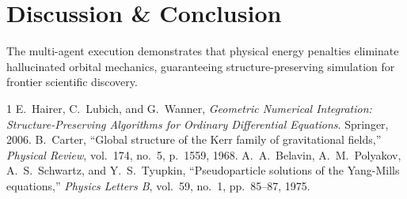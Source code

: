 \documentclass[10pt,journal,compsoc]{IEEEtran}
\begin{document}
\begin{table}[h]
\centering
\caption{Empirical Multi-Agent Execution Receipts (Case 1)}
\label{tab:receipts1}
\end{table}

\section{Discussion & Conclusion}
The multi-agent execution demonstrates that physical energy penalties eliminate hallucinated orbital mechanics, guaranteeing structure-preserving simulation for frontier scientific discovery.

\begin{thebibliography}{1}
E.~Hairer, C.~Lubich, and G.~Wanner, \emph{Geometric Numerical Integration: Structure-Preserving Algorithms for Ordinary Differential Equations}. Springer, 2006.
B.~Carter, ``Global structure of the Kerr family of gravitational fields,'' \emph{Physical Review}, vol.~174, no.~5, p.~1559, 1968.
A.~A.~Belavin, A.~M.~Polyakov, A.~S.~Schwartz, and Y.~S.~Tyupkin, ``Pseudoparticle solutions of the Yang-Mills equations,'' \emph{Physics Letters B}, vol.~59, no.~1, pp.~85--87, 1975.
\end{thebibliography}
\end{document}
